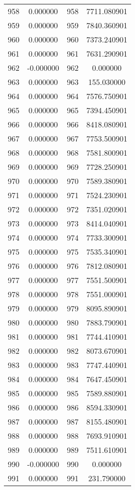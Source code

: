 \documentclass[12pt]{article}
\begin{document}
\begin{longtable}{@{}cccc@{}}
958 & 0.000000 & 958 & 7711.080901 \\
959 & 0.000000 & 959 & 7840.360901 \\
960 & 0.000000 & 960 & 7373.240901 \\
961 & 0.000000 & 961 & 7631.290901 \\
962 & -0.000000 & 962 & 0.000000 \\
963 & 0.000000 & 963 & 155.030000 \\
964 & 0.000000 & 964 & 7576.750901 \\
965 & 0.000000 & 965 & 7394.450901 \\
966 & 0.000000 & 966 & 8418.080901 \\
967 & 0.000000 & 967 & 7753.500901 \\
968 & 0.000000 & 968 & 7581.800901 \\
969 & 0.000000 & 969 & 7728.250901 \\
970 & 0.000000 & 970 & 7589.380901 \\
971 & 0.000000 & 971 & 7524.230901 \\
972 & 0.000000 & 972 & 7351.020901 \\
973 & 0.000000 & 973 & 8414.040901 \\
974 & 0.000000 & 974 & 7733.300901 \\
975 & 0.000000 & 975 & 7535.340901 \\
976 & 0.000000 & 976 & 7812.080901 \\
977 & 0.000000 & 977 & 7551.500901 \\
978 & 0.000000 & 978 & 7551.000901 \\
979 & 0.000000 & 979 & 8095.890901 \\
980 & 0.000000 & 980 & 7883.790901 \\
981 & 0.000000 & 981 & 7744.410901 \\
982 & 0.000000 & 982 & 8073.670901 \\
983 & 0.000000 & 983 & 7747.440901 \\
984 & 0.000000 & 984 & 7647.450901 \\
985 & 0.000000 & 985 & 7589.880901 \\
986 & 0.000000 & 986 & 8594.330901 \\
987 & 0.000000 & 987 & 8155.480901 \\
988 & 0.000000 & 988 & 7693.910901 \\
989 & 0.000000 & 989 & 7511.610901 \\
990 & -0.000000 & 990 & 0.000000 \\
991 & 0.000000 & 991 & 231.790000 \\

\end{longtable}
\end{document}
